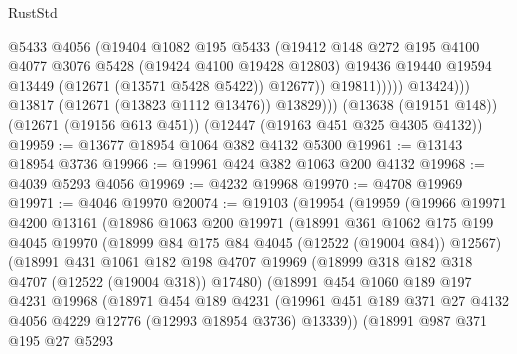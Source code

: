 \begin{lexlean}{RustStd}
\begin{coremodule}
                          @5433
                          @4056
                          (@19404
                            @1082
                            @195
                            @5433
                            (@19412
                              @148
                              @272
                              @195
                              @4100
                              @4077
                              @3076
                              @5428
                              (@19424 @4100 @19428 @12803)
                              @19436
                              @19440
                              @19594
                              @13449
                              (@12671 (@13571 @5428 @5422))
                              @12677))
                          @19811)))))
                @13424)))
          @13817
          (@12671 (@13823 @1112 @13476))
          @13829)))
    (@13638 (@19151 @148))
    (@12671 (@19156 @613 @451))
    (@12447 (@19163 @451 @325 @4305 @4132))
@19959 := @13677 @18954 @1064 @382 @4132 @5300
@19961 := @13143 @18954 @3736
@19966 := @19961 @424 @382 @1063 @200 @4132
@19968 := @4039 @5293 @4056
@19969 := @4232 @19968
@19970 := @4708 @19969
@19971 := @4046 @19970
@20074 := @19103
    (@19954
      (@19959
        (@19966
          @19971
          @4200
          @13161
          (@18986
            @1063
            @200
            @19971
            (@18991
              @361
              @1062
              @175
              @199
              @4045
              @19970
              (@18999 @84 @175 @84 @4045 (@12522 (@19004 @84)) @12567)
              (@18991
                @431
                @1061
                @182
                @198
                @4707
                @19969
                (@18999 @318 @182 @318 @4707 (@12522 (@19004 @318)) @17480)
                (@18991
                  @454
                  @1060
                  @189
                  @197
                  @4231
                  @19968
                  (@18971
                    @454
                    @189
                    @4231
                    (@19961
                      @451
                      @189
                      @371
                      @27
                      @4132
                      @4056
                      @4229
                      @12776
                      (@12993 @18954 @3736)
                      @13339))
                  (@18991
                    @987
                    @371
                    @195
                    @27
                    @5293

\end{coremodule}
\end{lexlean}
